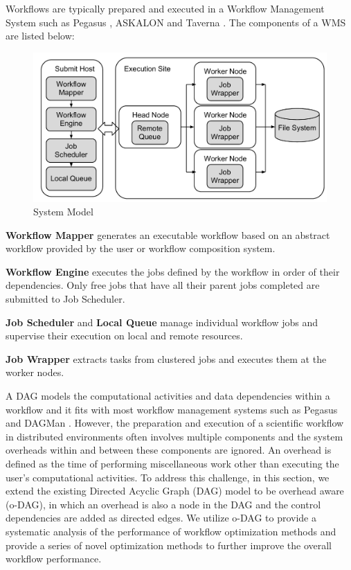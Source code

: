 Workflows are typically prepared and executed in a Workflow Management System such as Pegasus \cite{Deelman2004}, ASKALON \cite{Ostermann2009b} and Taverna \cite{Calasanz2008}. The components of a WMS are listed below: 

\begin{figure}[h!]
\centering
  \includegraphics[width=0.7\linewidth]{figures/model/model.pdf}

  \caption{System Model}
  \label{fig:model_system}
\end{figure}


\textbf{Workflow Mapper} generates an executable workflow based on an abstract workflow provided by the user or workflow composition system. 

\textbf{Workflow Engine} executes the jobs defined by the workflow in order of their dependencies. Only free jobs that have all their parent jobs completed are submitted to  Job Scheduler. 

\textbf{Job Scheduler} and \textbf{Local Queue} manage individual workflow jobs and supervise their execution on local and remote resources.

\textbf{Job Wrapper} extracts tasks from clustered jobs and executes them at the worker nodes. 

A DAG models the computational activities and data dependencies within a workflow and it fits with most workflow management systems such as Pegasus \cite{Deelman2004} and DAGMan \cite{Kalayci2010}. However, the preparation and execution of a scientific workflow in distributed environments often involves multiple components and the system overheads within and between these components are ignored. 
An overhead is defined as the time of performing miscellaneous work other than executing the user’s computational activities. 
To address this challenge, in this section, we extend the existing Directed Acyclic Graph (DAG) model to be overhead aware (o-DAG), in which an overhead is also a node in the DAG and the control dependencies are added as directed edges. We utilize o-DAG to provide a systematic analysis of the performance of workflow optimization methods and provide a series of novel optimization methods to further improve the overall workflow performance. 


